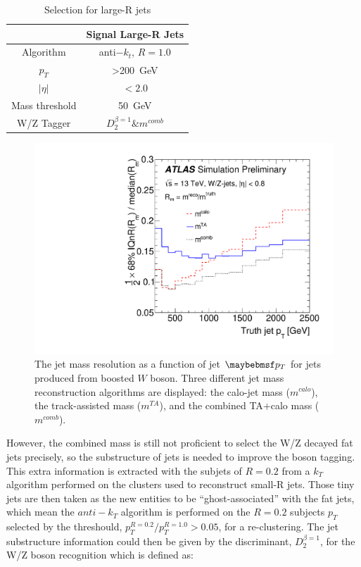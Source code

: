 \begin{table}[h]
	\caption{Selection for large-R jets}\label{Tab:Jdefinit}
	\vspace{2.0em}
	\centering
	\begin{tabular}{|c||c|}
		\hline
		& Signal Large-R Jets\\
		\hline
		Algorithm & anti$-k_t$, $R=1.0$\\
		$p_{T}$   & >200~GeV\\
		$| \eta |$      & $< 2.0 $\\
		Mass threshold  & 50~GeV\\
		W/Z Tagger &  $D^{\beta =1}_2 \& m^{comb}$ \\
		\hline
	\end{tabular}
\end{table}
\begin{figure}[ht]
	\begin{center}
		\includegraphics[width=0.6\hsize]{Chapter3/mass_resolution}
		\caption{The jet mass resolution as a function of jet $\p_{T}$ for jets produced from boosted $W$ boson\cite{ATLAS-CONF-2016-035}. Three different jet mass reconstruction algorithms are displayed: the calo-jet mass ($m^{{calo}}$), the track-assisted mass ($m^{{TA}}$), and the combined TA+calo mass ($m^{{comb}}$).}
		\label{Fig:combinedmassperformance}
	\end{center}
\end{figure}
\noindent
However, the combined mass is still not proficient to select the W/Z decayed fat jets precisely, so the substructure of jets is needed to improve the boson tagging. This extra information is extracted with the subjets of $R=0.2$ from a $k_{T}$ algorithm performed on the clusters used to reconstruct small-R jets. Those tiny jets are then taken as the new entities to be ``ghost-associated'' with the fat jets, which mean the $anti-k_{T}$ algorithm is performed on the $R=0.2$ subjects $p_{T}$ selected by the threshould, $p_{T}^{R=0.2}/p_{T}^{R=1.0}>0.05$, for a re-clustering. The jet substructure information could then be given by the discriminant, $D^{\beta =1}_{2}$, for the W/Z boson recognition\cite{Larkoski:2014gra} which is defined as:
